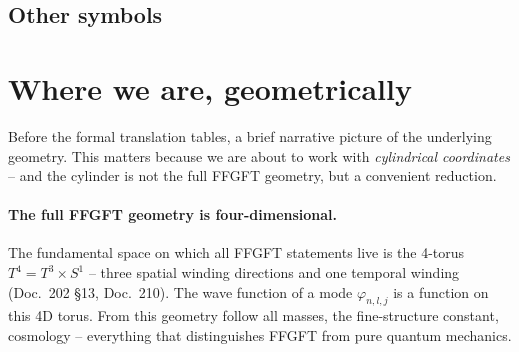 \subsection*{Other symbols}

\begin{center}
\renewcommand{\arraystretch}{1.3}
{\small
{}
}
\renewcommand{\arraystretch}{1.0}
\end{center}

\section*{Where we are, geometrically}

Before the formal translation tables, a brief narrative picture of
the underlying geometry. This matters because we are about to work
with \emph{cylindrical coordinates} -- and the cylinder is not the
full FFGFT geometry, but a convenient reduction.

\paragraph{The full FFGFT geometry is four-dimensional.}
The fundamental space on which all FFGFT statements live is the
4-torus $T^4 = T^3 \times S^1$ -- three spatial winding directions
and one temporal winding (Doc.~202 §13, Doc.~210). The wave
function of a mode $\varphi_{n,l,j}$ is a function on this 4D
torus. From this geometry follow all masses, the fine-structure
constant, cosmology -- everything that distinguishes FFGFT from
pure quantum mechanics.

